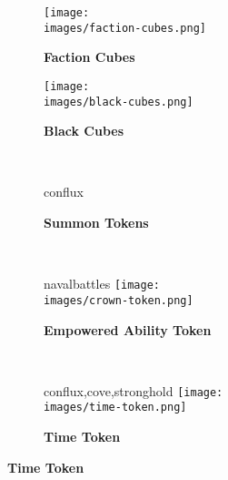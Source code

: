 \begin{figure}[H]
  \centering
  \begin{subfigure}[c]{0.15\linewidth}
    \centering
    \texttt{[image: \\images/faction-cubes.png]}
    \caption{\textbf{Faction Cubes}}
  \end{subfigure}
  \begin{subfigure}[c]{0.15\linewidth}
    \centering
    \texttt{[image: \\images/black-cubes.png]}
    \caption{\textbf{Black Cubes}}
  \end{subfigure}
  ~
  \begin{subfigure}[c]{0.15\linewidth}
    \begin{expansionmini}{conflux}
      \centering
      \caption{\textbf{Summon Tokens}}
    \end{expansionmini}
  \end{subfigure}
  ~
  \begin{subfigure}[c]{0.15\linewidth}
    \begin{expansionmini}{navalbattles}
      \centering
      \vspace{0.5em}
      \texttt{[image: \\images/crown-token.png]}
      \caption{\textbf{Empowered Ability Token}}
    \end{expansionmini}
  \end{subfigure}
  ~
  \begin{subfigure}[c]{0.2\linewidth}
    \begin{expansionmini}{conflux,cove,stronghold}
      \centering
      \vspace{0.5em}
      \texttt{[image: \\images/time-token.png]}
      \caption{\textbf{Time Token}}
    \end{expansionmini}
  \end{subfigure}
\end{figure}

